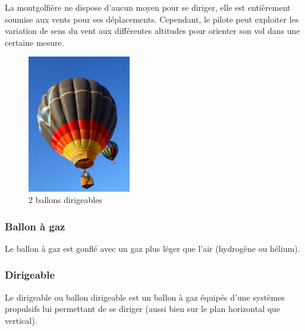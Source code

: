 	La montgolfière ne dispose d'aucun moyen pour se diriger, elle est entièrement soumise aux vents pour ses déplacements. Cependant, le pilote peut exploiter les variation de sens du vent aux différentes altitudes pour orienter son vol dans une certaine mesure.
	
	\begin{figure}[H]
  	\centering
    \includegraphics[width=0.4\textwidth]{1-EtudeAeronefs/img/montgolfiere.jpg}
  	\caption{2 ballons dirigeables \cite{img:montgolfiere}}
	\end{figure}	
	
	\subsubsection{Ballon à gaz}
	Le ballon à gaz  est gonflé avec un gaz plus léger que l'air (hydrogène ou hélium).	
	
	\subsubsection{Dirigeable}
	Le dirigeable  ou ballon dirigeable est un ballon à gaz équipés d'une systèmes propulsifs lui permettant de se diriger (aussi bien sur le plan horizontal que vertical). \\
	
